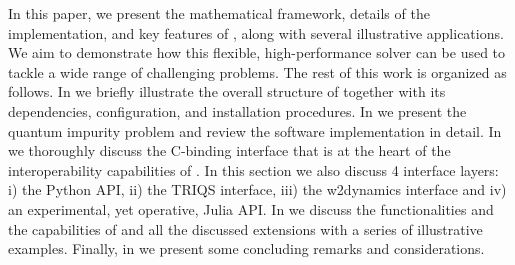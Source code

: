 \documentclass[edipack_sp.tex]{subfiles}
\begin{document}
In this paper, we present the mathematical framework, details of the implementation, and key features of \NAME, along with several illustrative applications. We aim to demonstrate how this flexible,
high-performance solver can be used to tackle a wide range of
challenging problems. 
The rest of this work is organized as follows. In  we 
briefly illustrate the overall structure of \NAME together with its dependencies, configuration, and installation procedures. In  we present the quantum impurity
problem and review the software implementation in detail. In  we thoroughly discuss the C-binding interface that is at the heart of the 
interoperability capabilities of \NAME. In this section we also discuss 4 interface layers: i) 
the Python API, ii) the TRIQS interface, iii) the w2dynamics interface and iv) an experimental, yet operative, Julia API.
In  we discuss the functionalities and the capabilities of \NAME and  all the discussed extensions with a series of illustrative examples. 
Finally, in  we present some concluding remarks and considerations. 

\ifSubfilesClassLoaded{
  
}{}
\end{document}
